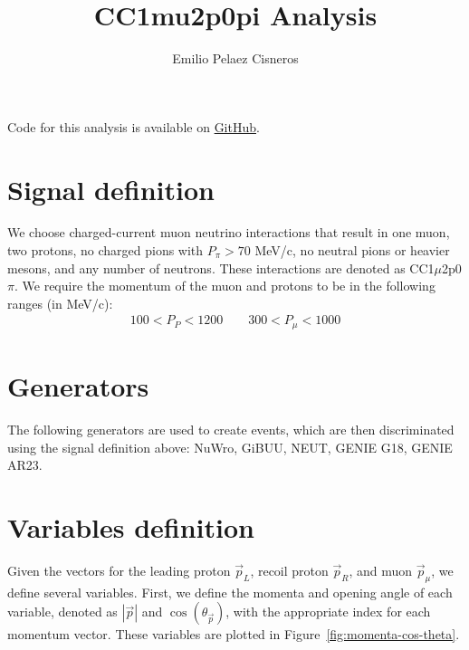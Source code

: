 \documentclass{article}
\title{CC1mu2p0pi Analysis}
\author{Emilio Pelaez Cisneros}
\newcommand{\vm}{\vec{p}_\mu}
\newcommand{\vlp}{\vec{p}_L}
\newcommand{\vrp}{\vec{p}_R}
\begin{document}
\maketitle

Code for this analysis is available on \href{https://github.com/epelaaez/CC1muAnalysis/tree/main}{GitHub}.

\section{Signal definition}

We choose charged-current muon neutrino interactions that result in one muon, two protons, no charged pions with $P_{\pi} > 70$ MeV/c, no neutral pions or heavier mesons, and any number of neutrons. These interactions are denoted as CC1$\mu$2p0$\pi$. We require the momentum of the muon and protons to be in the following ranges (in MeV/c):
\begin{align}
    100 < P_P < 1200 \qquad 300 < P_\mu < 1000
\end{align}

\section{Generators}

The following generators are used to create events, which are then discriminated using the signal definition above: NuWro, GiBUU, NEUT, GENIE G18, GENIE AR23.

\section{Variables definition}

Given the vectors for the leading proton $\vlp$, recoil proton $\vrp$, and muon $\vm$, we 
define several variables. First, we define the momenta and opening angle of each variable, denoted as $|\vec p|$ and $\cos(\theta_{\vec p})$, with the appropriate index for each momentum vector. These variables are plotted in Figure~\ref{fig:momenta-cos-theta}.
\end{document}
